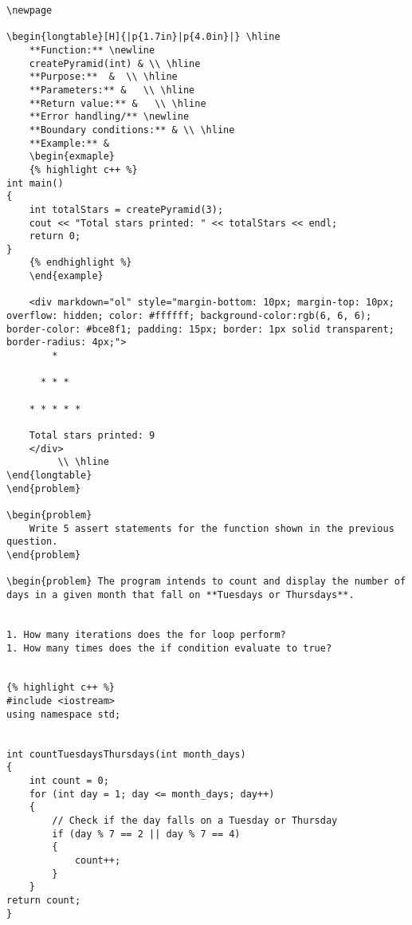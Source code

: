 {{{{{{{{{{\begin{problem}
\begin{verbatim}
\newpage

\begin{longtable}[H]{|p{1.7in}|p{4.0in}|} \hline
    **Function:** \newline 
    createPyramid(int) & \\ \hline
    **Purpose:**  &  \\ \hline
    **Parameters:** &   \\ \hline
    **Return value:** &   \\ \hline
    **Error handling/** \newline
    **Boundary conditions:** & \\ \hline
    **Example:** & 
    \begin{exmaple}
    {% highlight c++ %}    
int main()
{
    int totalStars = createPyramid(3);
    cout << "Total stars printed: " << totalStars << endl;
    return 0;
}
    {% endhighlight %}
    \end{example}

    <div markdown="ol" style="margin-bottom: 10px; margin-top: 10px; overflow: hidden; color: #ffffff; background-color:rgb(6, 6, 6); border-color: #bce8f1; padding: 15px; border: 1px solid transparent; border-radius: 4px;">
        * 
        
      * * * 
      
    * * * * * 
    
    Total stars printed: 9
    </div>
         \\ \hline
\end{longtable}
\end{problem}

\begin{problem}
    Write 5 assert statements for the function shown in the previous question.
\end{problem}

\begin{problem} The program intends to count and display the number of days in a given month that fall on **Tuesdays or Thursdays**.


1. How many iterations does the for loop perform?
1. How many times does the if condition evaluate to true?


{% highlight c++ %}
#include <iostream>
using namespace std;


int countTuesdaysThursdays(int month_days)
{
    int count = 0;
    for (int day = 1; day <= month_days; day++)
    {
        // Check if the day falls on a Tuesday or Thursday
        if (day % 7 == 2 || day % 7 == 4)
        {
            count++;
        }
    }
return count;
}


\end{verbatim}
\end{problem}}}}}}}}}}}
